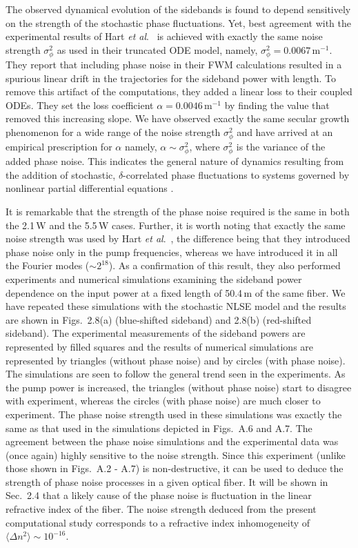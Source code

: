 The observed dynamical evolution of the sidebands is found to depend 
sensitively on the strength of the stochastic phase fluctuations. Yet, best 
agreement with the experimental results of Hart {\it et al}.\ \cite{hart1} is 
achieved with exactly the same noise strength $\sigma^2_\phi$ as used in 
their truncated ODE model, namely, $\sigma^2_\phi = 0.0067$\,m$^{-1}$. They 
report that including phase noise in their FWM calculations resulted in a 
spurious linear drift in the trajectories for the sideband power with length. 
To remove this artifact of the computations, they added a linear loss to their 
coupled ODEs. They set the loss coefficient $\alpha = 0.0046$\,m$^{-1}$ by 
finding the value that removed this increasing slope. We have observed exactly 
the same secular growth phenomenon for a wide range of the noise strength 
$\sigma^2_\phi$ and have arrived at an empirical prescription for $\alpha$ 
namely, $\alpha\sim\sigma^2_\phi$, where $\sigma^2_\phi$ is the 
variance of the added phase noise. This indicates the general nature of 
dynamics resulting from the addition of stochastic, $\delta$-correlated phase 
fluctuations to systems governed by nonlinear partial differential equations 
\cite{risken}. 

It is remarkable that the strength of the phase noise required is the same in 
both the 2.1\,W and the 5.5\,W cases. Further, it is worth noting that exactly 
the same noise strength was used by Hart {\it et al}.\ \cite{hart1}, the difference 
being that they introduced phase noise only in the pump frequencies, whereas 
we have introduced it in all the Fourier modes ($\sim2^{18}$). As a 
confirmation of this result, they also performed experiments and numerical 
simulations examining the sideband power dependence on the input power at a 
fixed length of 50.4\,m of the same fiber. We have repeated these simulations 
with the stochastic NLSE model and the results are shown in Figs.\ 2.8(a) 
(blue-shifted sideband) and 2.8(b) (red-shifted sideband). The experimental 
measurements of the sideband powers are represented by filled squares and the 
results of numerical simulations are represented by triangles (without phase 
noise) and by circles (with phase noise). The simulations are seen to follow 
the general trend seen in the experiments. As the pump power is increased, the 
triangles (without phase noise) start to disagree with experiment, whereas the 
circles (with phase noise) are much closer to experiment. The phase noise 
strength used in these simulations was exactly the same as that used in the 
simulations depicted in Figs.\ A.6 and A.7. The agreement between the phase noise 
simulations and the experimental data was (once again) highly sensitive to the 
noise strength. Since this experiment (unlike those shown in Figs.\ A.2 - A.7) 
is non-destructive, it can be used to deduce the strength of phase noise 
processes in a given optical fiber. It will be shown in Sec.\ 2.4 that a 
likely cause of the phase noise is fluctuation in the linear refractive index 
of the fiber. The noise strength deduced from the present computational study 
corresponds to a refractive index inhomogeneity of 
$\langle \Delta n^{2} \rangle \sim 10^{-16}$.   

